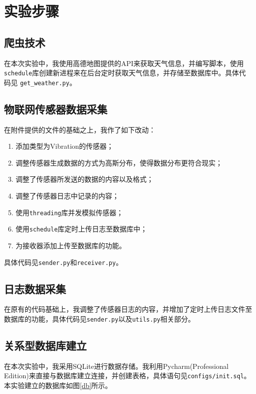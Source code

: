\section{实验步骤}
\subsection{爬虫技术}
在本次实验中，我使用高德地图提供的API来获取天气信息，并编写脚本，使用\texttt{schedule}库创建新进程来在后台定时获取天气信息，并存储至数据库中。具体代码见 \texttt{get\_weather.py}。
\subsection{物联网传感器数据采集}
在附件提供的文件的基础之上，我作了如下改动：
\begin{enumerate}
    \item 添加类型为Vibration的传感器；
    \item 调整传感器生成数据的方式为高斯分布，使得数据分布更符合现实；
    \item 调整了传感器所发送的数据的内容以及格式；
    \item 调整了传感器日志中记录的内容；
    \item 使用\texttt{threading}库并发模拟传感器；
    \item 使用\texttt{schedule}库定时上传日志至数据库中；
    \item 为接收器添加上传至数据库的功能。
\end{enumerate}
具体代码见\texttt{sender.py}和\texttt{receiver.py}。
\subsection{日志数据采集}
在原有的代码基础上，我调整了传感器日志的内容，并增加了定时上传日志文件至数据库的功能，具体代码见\texttt{sender.py}以及\texttt{utils.py}相关部分。
\subsection{关系型数据库建立}
在本次实验中，我采用SQLite进行数据存储。我利用Pycharm(Professional Edition)来直接与数据库建立连接，并创建表格，具体语句见\texttt{configs/init.sql}。
本实验建立的数据库如图\ref{db}所示。

